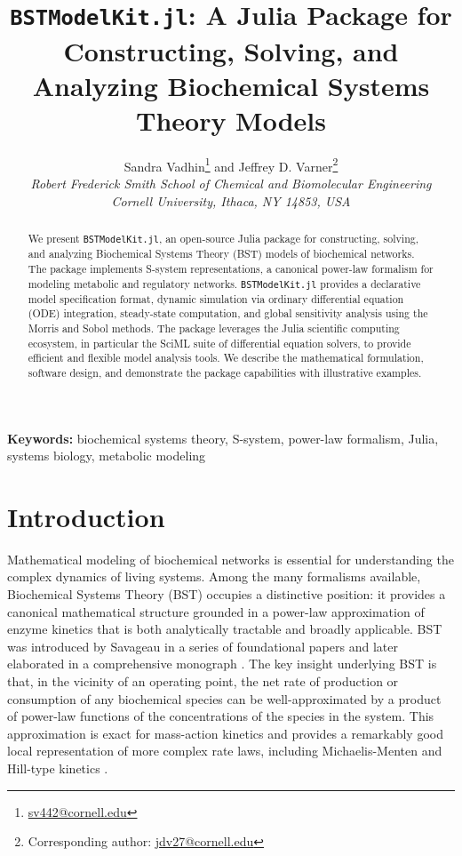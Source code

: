 \documentclass[11pt]{article}
\title{\texttt{BSTModelKit.jl}: A Julia Package for Constructing, Solving, and Analyzing Biochemical Systems Theory Models}
\author{
    Sandra Vadhin\thanks{\href{mailto:sv442@cornell.edu}{sv442@cornell.edu}}\hspace{2pt} and
    Jeffrey D. Varner\thanks{Corresponding author: \href{mailto:jdv27@cornell.edu}{jdv27@cornell.edu}} \\
    \textit{Robert Frederick Smith School of Chemical and Biomolecular Engineering} \\
    \textit{Cornell University, Ithaca, NY 14853, USA}
}
\date{}
\begin{document}
\maketitle

\begin{abstract}
We present \texttt{BSTModelKit.jl}, an open-source Julia package for constructing, solving, and analyzing Biochemical Systems Theory (BST) models of biochemical networks. The package implements S-system representations, a canonical power-law formalism for modeling metabolic and regulatory networks. \texttt{BSTModelKit.jl} provides a declarative model specification format, dynamic simulation via ordinary differential equation (ODE) integration, steady-state computation, and global sensitivity analysis using the Morris and Sobol methods. The package leverages the Julia scientific computing ecosystem, in particular the SciML suite of differential equation solvers, to provide efficient and flexible model analysis tools. We describe the mathematical formulation, software design, and demonstrate the package capabilities with illustrative examples.
\end{abstract}

\noindent\textbf{Keywords:} biochemical systems theory, S-system, power-law formalism, Julia, systems biology, metabolic modeling

\section{Introduction}\label{sec:introduction}
Mathematical modeling of biochemical networks is essential for understanding the complex dynamics of living systems. Among the many formalisms available, Biochemical Systems Theory (BST) occupies a distinctive position: it provides a canonical mathematical structure grounded in a power-law approximation of enzyme kinetics that is both analytically tractable and broadly applicable. BST was introduced by Savageau in a series of foundational papers \citep{Savageau1969a,Savageau1969b,Savageau1970} and later elaborated in a comprehensive monograph \citep{Savageau1976}. The key insight underlying BST is that, in the vicinity of an operating point, the net rate of production or consumption of any biochemical species can be well-approximated by a product of power-law functions of the concentrations of the species in the system. This approximation is exact for mass-action kinetics and provides a remarkably good local representation of more complex rate laws, including Michaelis-Menten and Hill-type kinetics \citep{Savageau1976,Voit2000}.
\end{document}
